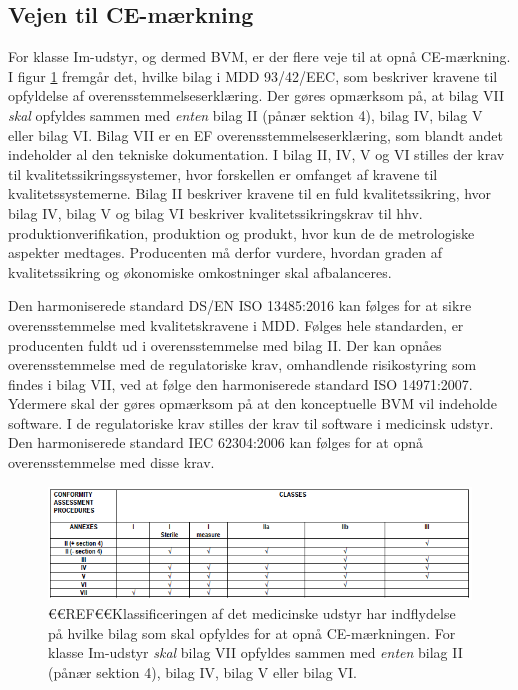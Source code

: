 \subsection{Vejen til CE-mærkning}

For klasse Im-udstyr, og dermed BVM, er der flere veje til at opnå CE-mærkning. I figur \ref{fig:Klas} fremgår det, hvilke bilag i MDD 93/42/EEC, som beskriver kravene til opfyldelse af overensstemmelseserklæring. Der gøres opmærksom på, at bilag VII \textit{skal} opfyldes sammen med \textit{enten} bilag II (pånær sektion 4), bilag IV, bilag V eller bilag VI. Bilag VII er en EF overensstemmelseserklæring, som blandt andet indeholder al den tekniske dokumentation. I bilag II, IV, V og VI stilles der krav til kvalitetssikringssystemer, hvor forskellen er omfanget af kravene til kvalitetssystemerne. Bilag II beskriver kravene til en fuld kvalitetssikring, hvor bilag IV, bilag V og bilag VI beskriver kvalitetssikringskrav til hhv. produktionverifikation, produktion og produkt, hvor kun de de metrologiske aspekter medtages. Producenten må derfor vurdere, hvordan graden af kvalitetssikring og økonomiske omkostninger skal afbalanceres.   

    Den harmoniserede standard DS/EN ISO 13485:2016 kan følges for at sikre overensstemmelse med kvalitetskravene i MDD. Følges hele standarden, er producenten fuldt ud i overensstemmelse med bilag II.
    Der kan opnåes overensstemmelse med de regulatoriske krav, omhandlende risikostyring som findes i bilag VII, ved at følge den harmoniserede standard ISO 14971:2007.
Ydermere skal der gøres opmærksom på at den konceptuelle BVM vil indeholde software. I de regulatoriske krav stilles der krav til software i medicinsk udstyr. Den harmoniserede standard IEC 62304:2006 kan følges for at opnå overensstemmelse med disse krav.   


\begin{figure}[htb]
\centering
\includegraphics[width=5in]{Klassificering}
\caption{€€REF€€Klassificeringen af det medicinske udstyr har indflydelse på hvilke bilag som skal opfyldes for at opnå CE-mærkningen. For klasse Im-udstyr \textit{skal} bilag VII opfyldes sammen med \textit{enten} bilag II (pånær sektion 4), bilag IV, bilag V eller bilag VI. }
\label{fig:Klas}
\end{figure}

